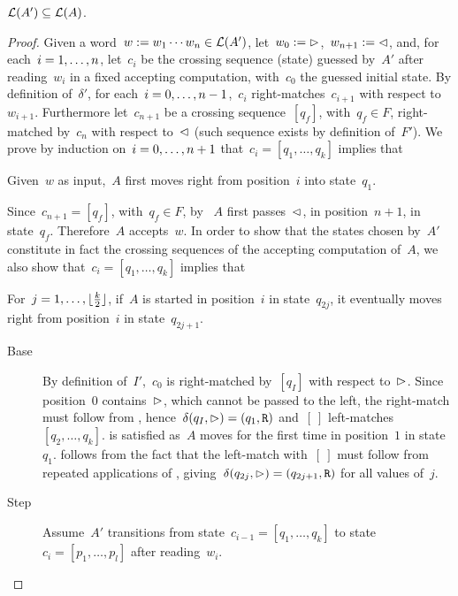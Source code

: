 \begin{lemm}\label{lem:2DFAto1NFA-2}
	$\mathcal L(A')\subseteq\mathcal L(A)$.
\end{lemm}
\begin{proof}
	Given a word~$w:=w_1\cdots w_n\in\mathcal L(A')$, let~$w_0:=\rhd$,~$w_{n+1}:=\lhd$, and, for each~$i=1,\dots,n$, let~$c_i$ be the crossing sequence (state) guessed by~$A'$ after reading~$w_i$ in a fixed accepting computation, with~$c_0$ the guessed initial state.
	By definition of~$\delta'$, for each~$i=0,\dots,n-1$,~$c_i$ right-matches~$c_{i+1}$ with respect to~$w_{i+1}$.
	Furthermore let~$c_{n+1}$ be a crossing sequence~$[q_f]$, with~$q_f\in F$, right-matched by~$c_n$ with respect to~$\lhd$ (such sequence exists by definition of~$F'$).
	We prove by induction on~$i=0,\dots,n+1$ that~$c_i=[q_1,\dots,q_k]$ implies that
	\begin{statements}
		\item \label{lem:2DFAto1NFA-2-1} Given~$w$ as input,~$A$ first moves right from position~$i$ into state~$q_1$.
	\end{statements}
	Since~$c_{n+1}=[q_f]$, with~$q_f\in F$, by ~$A$ first passes~$\lhd$, in position~$n+1$, in state~$q_f$. Therefore~$A$ accepts~$w$.
	In order to show that the states chosen by~$A'$ constitute in fact the crossing sequences of the accepting computation of~$A$, we also show that~$c_i=[q_1,\dots,q_k]$ implies that
	\begin{statements}[resume]
		\item \label{lem:2DFAto1NFA-2-2} For~$j=1,\dots,\lfloor \frac{k}{2} \rfloor$, if~$A$ is started in position~$i$ in state~$q_{2j}$, it eventually moves right from position~$i$ in state~$q_{2j+1}$.
	\end{statements}
	\begin{description}
		\item[Base] By definition of~$I'$,~$c_0$ is right-matched by~$[q_I]$ with respect to~$\rhd$. Since position~$0$ contains~$\rhd$, which cannot be passed to the left, the right-match must follow from , hence~$\delta(q_I,\rhd)=(q_1,\mathtt R)$ and~$[~]$ left-matches~$[q_2,\dots,q_k]$.
		       is satisfied as~$A$ moves for the first time in position~$1$ in state~$q_1$.
		       follows from the fact that the left-match with~$[~]$ must follow from repeated applications of , giving~$\delta(q_{2j},\rhd)=(q_{2j+1},\mathtt R)$ for all values of~$j$.
		\item[Step] Assume~$A'$ transitions from state~$c_{i-1}=[q_1,\dots,q_k]$ to state~$c_i=[p_1,\dots,p_l]$ after reading~$w_i$.

\end{description}
\end{proof}
